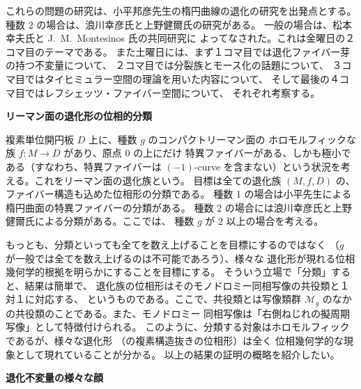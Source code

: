 \documentclass[uplatex,dvipdfmx]{jlreq}
\begin{document}
これらの問題の研究は、小平邦彦先生の楕円曲線の退化の研究を出発点とする。
種数 $2$ の場合は、浪川幸彦氏と上野健爾氏の研究がある。
一般の場合は、松本幸夫氏と J.~M.~Montesinos 氏の共同研究に
よってなされた。これは金曜日の２コマ目のテーマである。
また土曜日には、まず１コマ目では退化ファイバー芽の持つ不変量について、
２コマ目では分裂族とモース化の話題について、
３コマ目ではタイヒミュラー空間の理論を用いた内容について、
そして最後の４コマ目ではレフシェッツ・ファイバー空間について、
それぞれ考察する。

\newpage

\begin{center}
{\Large\bfseries リーマン面の退化形の位相的分類}

\hspace*{\fill}{\large\bfseries 松本 幸夫（東大・数理）}
\end{center}

\bigskip

複素単位開円板 $D$ 上に、種数 $g$ のコンパクトリーマン面の
ホロモルフィックな族 $f: M \to D$ があり、原点 $0$ の上にだけ
特異ファイバーがある、しかも極小である（すなわち、特異ファイバーは
$(-1)$-curve を含まない）という状況を考える。これをリーマン面の退化族という。
目標は全ての退化族 $(M, f, D)$ の、ファイバー構造も込めた位相形の分類である。
種数 1 の場合は小平先生による楕円曲面の特異ファイバーの分類がある。
種数 2 の場合には浪川幸彦氏と上野健爾氏による分類がある。ここでは、
種数 $g$ が 2 以上の場合を考える。

もっとも、分類といっても全てを数え上げることを目標にするのではなく
（$g$ が一般では全てを数え上げるのは不可能であろう）、様々な
退化形が現れる位相幾何学的根拠を明らかにすることを目標にする。
そういう立場で「分類」すると、結果は簡単で、
退化族の位相形はそのモノドロミー同相写像の共役類と１対１に対応する、
というものである。ここで、共役類とは写像類群 ${\mathcal{M}}_g$
のなかの共役類のことである。また、モノドロミー
同相写像は「右側ねじれの擬周期写像」として特徴付けられる。
このように、分類する対象はホロモルフィックであるが、様々な退化形
（の複素構造抜きの位相形）は全く
位相幾何学的な現象として現れていることが分かる。
以上の結果の証明の概略を紹介したい。

\newpage

\begin{center}
{\Large\bfseries 退化不変量の様々な顔}

\hspace*{\fill}{\large\bfseries 足利 正（東北学院大・工）}
\end{center}
\end{document}
